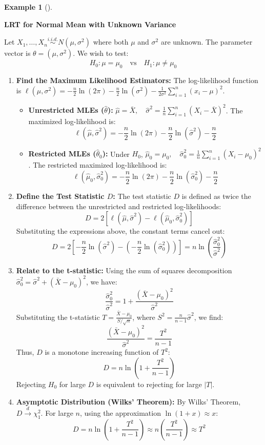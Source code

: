 \documentclass[
  letterpaper,
  DIV=11,
  numbers=noendperiod]{scrreprt}
\renewcommand{\[}{\begin{equation}}
\renewcommand{\]}{\end{equation}}
\theoremstyle{definition}
\theoremstyle{plain}
\theoremstyle{plain}
\theoremstyle{plain}
\theoremstyle{definition}
\newtheorem{example}{Example}[chapter]
\theoremstyle{plain}
\theoremstyle{remark}
\begin{document}
\begin{example}[]\protect\hypertarget{exm-lrt-normal}{}\label{exm-lrt-normal}

\textbf{LRT for Normal Mean with Unknown Variance}

Let \(X_1, \dots, X_n \overset{i.i.d.}{\sim} N(\mu, \sigma^2)\) where
both \(\mu\) and \(\sigma^2\) are unknown. The parameter vector is
\(\theta = (\mu, \sigma^2)\). We wish to test:
\[H_0: \mu = \mu_0 \quad \text{vs} \quad H_1: \mu \neq \mu_0\]

\begin{enumerate}
\def\labelenumi{\arabic{enumi}.}
\item
  \textbf{Find the Maximum Likelihood Estimators:} The log-likelihood
  function is
  \(\ell(\mu, \sigma^2) = -\frac{n}{2}\ln(2\pi) - \frac{n}{2}\ln(\sigma^2) - \frac{1}{2\sigma^2}\sum_{i=1}^n (x_i - \mu)^2\).

  \begin{itemize}
  \item
    \textbf{Unrestricted MLEs (\(\hat{\theta}\)):}
    \(\hat{\mu} = \bar{X}, \quad \hat{\sigma}^2 = \frac{1}{n}\sum_{i=1}^n (X_i - \bar{X})^2\).
    The maximized log-likelihood is:
    \[\ell(\hat{\mu}, \hat{\sigma}^2) = -\frac{n}{2}\ln(2\pi) - \frac{n}{2}\ln(\hat{\sigma}^2) - \frac{n}{2}\]
  \item
    \textbf{Restricted MLEs (\(\hat{\theta}_0\)):} Under \(H_0\),
    \(\hat{\mu}_0 = \mu_0, \quad \hat{\sigma}_0^2 = \frac{1}{n}\sum_{i=1}^n (X_i - \mu_0)^2\).
    The restricted maximized log-likelihood is:
    \[\ell(\hat{\mu}_0, \hat{\sigma}_0^2) = -\frac{n}{2}\ln(2\pi) - \frac{n}{2}\ln(\hat{\sigma}_0^2) - \frac{n}{2}\]
  \end{itemize}
\item
  \textbf{Define the Test Statistic \(D\):} The test statistic \(D\) is
  defined as twice the difference between the unrestricted and
  restricted log-likelihoods:
  \[D = 2 \left[ \ell(\hat{\mu}, \hat{\sigma}^2) - \ell(\hat{\mu}_0, \hat{\sigma}_0^2) \right]\]
  Substituting the expressions above, the constant terms cancel out:
  \[D = 2 \left[ -\frac{n}{2}\ln(\hat{\sigma}^2) - \left( -\frac{n}{2}\ln(\hat{\sigma}_0^2) \right) \right] = n \ln \left( \frac{\hat{\sigma}_0^2}{\hat{\sigma}^2} \right)\]
\item
  \textbf{Relate to the t-statistic:} Using the sum of squares
  decomposition
  \(\hat{\sigma}_0^2 = \hat{\sigma}^2 + (\bar{X} - \mu_0)^2\), we have:
  \[\frac{\hat{\sigma}_0^2}{\hat{\sigma}^2} = 1 + \frac{(\bar{X} - \mu_0)^2}{\hat{\sigma}^2}\]
  Substituting the t-statistic
  \(T = \frac{\bar{X} - \mu_0}{S/\sqrt{n}}\), where
  \(S^2 = \frac{n}{n-1}\hat{\sigma}^2\), we find:
  \[\frac{(\bar{X} - \mu_0)^2}{\hat{\sigma}^2} = \frac{T^2}{n-1}\] Thus,
  \(D\) is a monotone increasing function of \(T^2\):
  \[D = n \ln \left( 1 + \frac{T^2}{n-1} \right)\] Rejecting \(H_0\) for
  large \(D\) is equivalent to rejecting for large \(|T|\).
\item
  \textbf{Asymptotic Distribution (Wilks' Theorem):} By Wilks' Theorem,
  \(D \xrightarrow{d} \chi^2_1\). For large \(n\), using the
  approximation \(\ln(1+x) \approx x\):
  \[D = n \ln \left( 1 + \frac{T^2}{n-1} \right) \approx n \left( \frac{T^2}{n-1} \right) \approx T^2\]


\end{enumerate}
\end{example}
\end{document}
